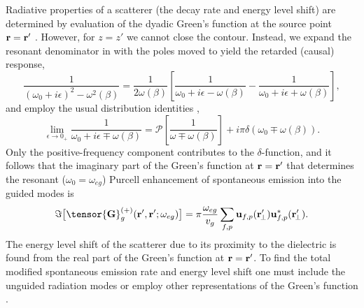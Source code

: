 \documentclass[preprint,aps,pra,onecolumn]{revtex4-1} %
\begin{document}
Radiative properties of a scatterer (the decay rate and energy level shift) are determined by evaluation of the dyadic Green's function at the source point $\mathbf{r} = \mathbf{r}'$ \cite{fussell_decay_2005}.  However, for $z=z'$ we cannot close the contour. Instead, we expand the resonant denominator in  with the poles moved to yield the retarded (causal) response,
\begin{equation}
\frac{1}{(\omega_0+i\epsilon)^2-\omega^2(\beta)}=\frac{1}{2 \omega(\beta)}\left[ \frac{1}{\omega_0+ i 
\epsilon - \omega(\beta)} - \frac{1}{\omega_0+ i \epsilon + \omega(\beta)} \right],
\end{equation}
 and employ the usual distribution identities \cite{sondergaard_general_2001},
\begin{equation}
\lim_{\epsilon \rightarrow 0_+} \frac{1}{\omega_0 + i \epsilon \mp 
\omega(\beta)}=\mathcal{P}\left[\frac{1}{\omega \mp \omega(\beta)} \right] + i \pi \delta (\omega_0 \mp 
\omega(\beta)).
\end{equation}
Only the positive-frequency component contributes to the $\delta$-function, and it follows that the imaginary part of the Green's function at $\mathbf{r} = \mathbf{r}'$ that determines the resonant ($\omega_0 = \omega_{eg}$) Purcell enhancement of spontaneous emission into the guided modes is \cite{dung_spontaneous_2000, fussell_decay_2005, chen_finite-element_2010}
	\begin{equation}\label{Eq::ImGreenLocal}
		\Im \big[\tensor{\mathbf{G}}^{(+)}_g(\br',\br'; \omega_{eg}) \big] = \pi \frac{\omega_{eg}}{v_g } \sum_{f, p} 
		\mathbf{u}_{f, p} (\br_{\!\perp}^\prime)\mathbf{u}^*_{f , p} (\br_{\!\perp}^\prime).
	\end{equation}
The energy level shift of the scatterer due to its proximity to the dielectric is found from the real part of the Green's function at $\mathbf{r} = \mathbf{r}'$. To find the total modified spontaneous emission rate and energy level shift one must include the unguided radiation modes \cite{le_kien_spontaneous_2005} or employ other representations of the Green's function \cite{klimov_spontaneous_2004}.  
\end{document}
